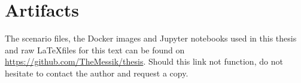 \section{Artifacts}

The scenario files, the Docker images and Jupyter notebooks used in this thesis and raw \LaTeX files for this text can be found on \url{https://github.com/TheMessik/thesis}. Should this link not function, do not hesitate to contact the author and request a copy.